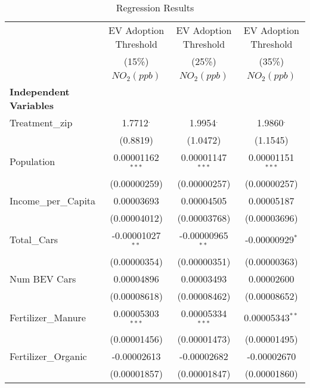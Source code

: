 \documentclass[12pt]{article}
\begin{document}
	\begin{table}[H]
		\centering
		\caption{Regression Results}
		\label{tab:regression_results}
		\begin{threeparttable}
			\begin{adjustbox}{max width=\textwidth}
				\begin{tabular}{l c c c}
					\toprule
					\toprule
					
					& EV Adoption Threshold & EV Adoption Threshold & EV Adoption Threshold \\
					& (15\%) & (25\%) & (35\%) \\
					\midrule
					& $NO_2 (ppb)$ & $NO_2 (ppb)$ & $NO_2 (ppb)$ \\
					\midrule
					\textbf{Independent Variables} & & & \\
					Treatment\_zip & 1.7712$^{.}$ & 1.9954$^{.}$ & 1.9860$^{.}$ \\
					& {\footnotesize (0.8819)} & {\footnotesize (1.0472)} & {\footnotesize (1.1545)} \\
					Population & 0.00001162$^{***}$ & 0.00001147$^{***}$ & 0.00001151$^{***}$ \\
					& {\footnotesize (0.00000259)} & {\footnotesize (0.00000257)} & {\footnotesize (0.00000257)} \\
					Income\_per\_Capita & 0.00003693 & 0.00004505 & 0.00005187 \\
					& {\footnotesize (0.00004012)} & {\footnotesize (0.00003768)} & {\footnotesize (0.00003696)} \\
					Total\_Cars & -0.00001027$^{**}$ & -0.00000965$^{**}$ & -0.00000929$^{*}$ \\  
					& {\footnotesize (0.00000354)} & {\footnotesize (0.00000351)} & {\footnotesize (0.00000363)} \\
					Num BEV Cars & 0.00004896 & 0.00003493 & 0.00002600 \\  
					& {\footnotesize (0.00008618)} & {\footnotesize (0.00008462)} & {\footnotesize (0.00008652)} \\
					Fertilizer\_Manure & 0.00005303$^{***}$ & 0.00005334$^{***}$ & 0.00005343$^{**}$ \\  
					& {\footnotesize (0.00001456)} & {\footnotesize (0.00001473)} & {\footnotesize (0.00001495)} \\
					Fertilizer\_Organic & -0.00002613 & -0.00002682 & -0.00002670 \\  
					& {\footnotesize (0.00001857)} & {\footnotesize (0.00001847)} & {\footnotesize (0.00001860)} \\

\end{tabular}
\end{adjustbox}
\end{threeparttable}
\end{table}
\end{document}
